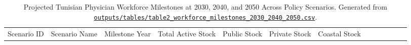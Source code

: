 \documentclass[
  11pt,
  a4paper]{article}
\begin{document}
\begin{longtable}[]{@{}
  >{\raggedright\arraybackslash}p{}
  >{\raggedright\arraybackslash}p{}
  >{\centering\arraybackslash}p{}
  >{\centering\arraybackslash}p{}
  >{\centering\arraybackslash}p{}
  >{\centering\arraybackslash}p{}
  >{\centering\arraybackslash}p{}
  >{\centering\arraybackslash}p{}
  >{\centering\arraybackslash}p{}
  >{\centering\arraybackslash}p{}
  >{\centering\arraybackslash}p{}
  >{\centering\arraybackslash}p{}
  >{\centering\arraybackslash}p{}@{}}
\caption{Projected Tunisian Physician Workforce Milestones at 2030,
2040, and 2050 Across Policy Scenarios. Generated from
\href{file:///c:/Users/drfir/Documents/physician-exodus-tunisia/outputs/tables/table2_workforce_milestones_2030_2040_2050.csv}{\protect\texttt{outputs/tables/table2\_workforce\_milestones\_2030\_2040\_2050.csv}}.}\label{tbl-policy-results}\tabularnewline
\toprule\noalign{}
\begin{minipage}[b]{\linewidth}\raggedright
Scenario ID
\end{minipage} & \begin{minipage}[b]{\linewidth}\raggedright
Scenario Name
\end{minipage} & \begin{minipage}[b]{\linewidth}\centering
Milestone Year
\end{minipage} & \begin{minipage}[b]{\linewidth}\centering
Total Active Stock
\end{minipage} & \begin{minipage}[b]{\linewidth}\centering
Public Stock
\end{minipage} & \begin{minipage}[b]{\linewidth}\centering
Private Stock
\end{minipage} & \begin{minipage}[b]{\linewidth}\centering
Coastal Stock
\end{minipage} & \begin{minipage}[b]{\linewidth}\centering

\end{minipage}
\end{longtable}
\end{document}
